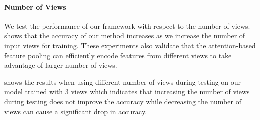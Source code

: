 


% 


% 

\paragraph{Number of Views}\vspace{-4mm}
We test the performance of our framework with respect to the number of views.
 shows that the accuracy of our method increases as we increase the number of input views for training.
These experiments also validate that the attention-based feature pooling can efficiently encode features from different views to take advantage of larger number of views.

 shows the results when using different number of views during testing on our model trained with 3 views
which indicates that increasing the number of views during testing does not improve the accuracy while decreasing the number of views can cause a significant drop in accuracy.

